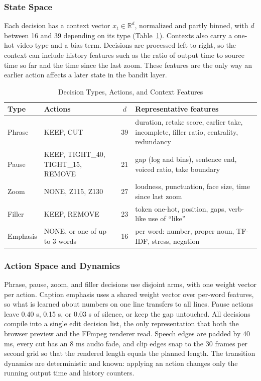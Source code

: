 \documentclass{ieeeaccess}
\begin{document}
\subsubsection{State Space}
Each decision has a context vector $x_t \in \mathbb{R}^{d}$, normalized and partly binned, with $d$ between 16 and 39 depending on its type (Table~\ref{tab:decisions}). Contexts also carry a one-hot video type and a bias term. Decisions are processed left to right, so the context can include history features such as the ratio of output time to source time so far and the time since the last zoom. These features are the only way an earlier action affects a later state in the bandit layer.

\begin{table}[t]
\caption{Decision Types, Actions, and Context Features}
\label{tab:decisions}
\setlength{\tabcolsep}{2.5pt}
\centering
\begin{tabular}{|p{11mm}|p{25mm}|c|p{32mm}|}
\hline
Type & Actions & $d$ & Representative features \\
\hline
Phrase & KEEP, CUT & 39 & duration, retake score, earlier take, incomplete, filler ratio, centrality, redundancy \\
Pause & KEEP, TIGHT\_40, TIGHT\_15, REMOVE & 21 & gap (log and bins), sentence end, voiced ratio, take boundary \\
Zoom & NONE, Z115, Z130 & 27 & loudness, punctuation, face size, time since last zoom \\
Filler & KEEP, REMOVE & 23 & token one-hot, position, gaps, verb-like use of ``like'' \\
Emphasis & NONE, or one of up to 3 words & 16 & per word: number, proper noun, TF-IDF, stress, negation \\
\hline
\end{tabular}
\end{table}

\subsubsection{Action Space and Dynamics}
Phrase, pause, zoom, and filler decisions use disjoint arms, with one weight vector per action. Caption emphasis uses a shared weight vector over per-word features, so what is learned about numbers on one line transfers to all lines. Pause actions leave 0.40 s, 0.15 s, or 0.03 s of silence, or keep the gap untouched. All decisions compile into a single edit decision list, the only representation that both the browser preview and the FFmpeg renderer read. Speech edges are padded by 40 ms, every cut has an 8 ms audio fade, and clip edges snap to the 30 frames per second grid so that the rendered length equals the planned length. The transition dynamics are deterministic and known: applying an action changes only the running output time and history counters.
\end{document}
